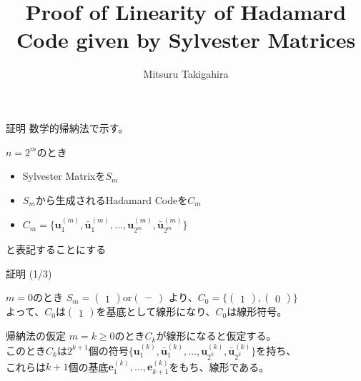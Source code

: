 \documentclass[dvipdfmx,10pt,jsarticle]{beamer}
\title{Proof of Linearity of Hadamard Code given by Sylvester Matrices}
\author{Mitsuru Takigahira}
\date[2017/10/20]{}
\begin{document}
  \frame{\maketitle}
  
  \begin{frame}{証明}
    数学的帰納法で示す。

    $n = 2^m$のとき
    \begin{itemize}
      \item Sylvester Matrixを$S_m$
      \item $S_m$から生成されるHadamard Codeを$C_m$
      \item $C_m = \lbrace \mathbf{u}_1^{(m)}, \bar{\mathbf{u}}^{(m)}_1, \ldots , \mathbf{u}_{2^m}^{(m)}, \bar{\mathbf{u}}^{(m)}_{2^m} \rbrace$
    \end{itemize}
    と表記することにする
  \end{frame}

  \begin{frame}{証明 (1/3)}
    \begin{block}{$m=0$のとき}
      $S_m = \begin{pmatrix}
        1
      \end{pmatrix} \text{or} \begin{pmatrix}
        -
      \end{pmatrix}$
      より、$C_0 = \lbrace \begin{pmatrix} 1 \end{pmatrix}, \begin{pmatrix} 0 \end{pmatrix} \rbrace$ \\
      よって、$C_0$は$\begin{pmatrix} 1 \end{pmatrix}$を基底として線形になり、$C_0$は線形符号。
    \end{block}
    \begin{block}{帰納法の仮定}
      $m = k \geq 0$のとき$C_k$が線形になると仮定する。 \\
      このとき$C_k$は$2^{k+1}$個の符号$\lbrace \mathbf{u}^{(k)}_1, \bar{\mathbf{u}}^{(k)}_1, \ldots , \mathbf{u}^{(k)}_{2^k}, \bar{\mathbf{u}}^{(k)}_{2^k} \rbrace$を持ち、\\
      これらは$k + 1$個の基底$\mathbf{e}^{(k)}_1, \ldots, \mathbf{e}^{(k)}_{k+1}$をもち、線形である。
    \end{block}
  \end{frame}
\end{document}
